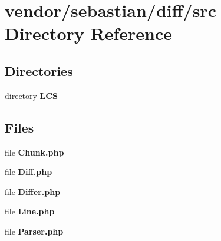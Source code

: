 \section{vendor/sebastian/diff/src Directory Reference}
\label{dir_c15513718c062582f3688d8bbfeb485b}
\subsection*{Directories}
\begin{DoxyCompactItemize}
\item 
directory {\bf L\+C\+S}
\end{DoxyCompactItemize}
\subsection*{Files}
\begin{DoxyCompactItemize}
\item 
file {\bf Chunk.\+php}
\item 
file {\bf Diff.\+php}
\item 
file {\bf Differ.\+php}
\item 
file {\bf Line.\+php}
\item 
file {\bf Parser.\+php}
\end{DoxyCompactItemize}
